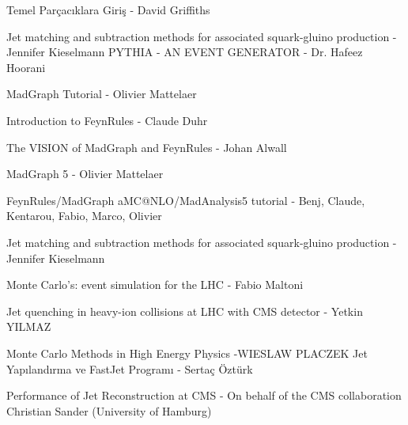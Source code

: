 \begin{thebibliography}{9}

  Temel Parçacıklara Giriş - David Griffiths
  
	Jet matching and subtraction methods for associated squark-gluino production - Jennifer Kieselmann
PYTHIA - AN EVENT GENERATOR - Dr. Hafeez Hoorani

MadGraph Tutorial - Olivier Mattelaer

Introduction to FeynRules - Claude Duhr

The VISION of MadGraph and FeynRules - Johan Alwall

MadGraph 5 - Olivier Mattelaer

FeynRules/MadGraph aMC@NLO/MadAnalysis5
tutorial - Benj, Claude, Kentarou, Fabio, Marco, Olivier

Jet matching and subtraction methods
for associated squark-gluino production - Jennifer Kieselmann

Monte Carlo’s:
event simulation for the LHC - Fabio Maltoni

Jet quenching in heavy-ion collisions at LHC with
CMS detector - Yetkin YILMAZ

Monte Carlo Methods
in High Energy Physics -WIESLAW PLACZEK
Jet Yapılandırma ve FastJet Programı - Sertaç Öztürk

Performance of Jet Reconstruction
at CMS - On behalf of the CMS collaboration
Christian Sander (University of Hamburg)
\end{thebibliography}
